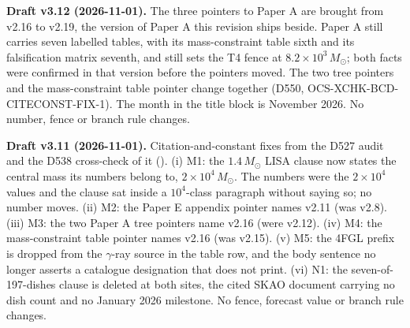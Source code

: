 \documentclass[11pt]{article}
\newcommand{\msun}{\ensuremath{M_\odot}}
\begin{document}
\textbf{Draft v3.12 (2026-11-01).} The three pointers to Paper A are brought from v2.16 to v2.19, the version of Paper A this revision ships beside. Paper A still carries seven labelled tables, with its mass-constraint table sixth and its falsification matrix seventh, and still sets the T4 fence at $8.2\times10^{3}\,\msun$; both facts were confirmed in that version before the pointers moved. The two tree pointers and the mass-constraint table pointer change together (D550, OCS-XCHK-BCD-CITECONST-FIX-1). The month in the title block is November 2026. No number, fence or branch rule changes.

\textbf{Draft v3.11 (2026-11-01).} Citation-and-constant fixes from the D527 audit and the D538 cross-check of it (). (i) M1: the $1.4\,\msun$ LISA clause now states the central mass its numbers belong to, $2\times10^{4}\,\msun$. The numbers were the $2\times10^{4}$ values and the clause sat inside a $10^{4}$-class paragraph without saying so; no number moves. (ii) M2: the Paper E appendix pointer names v2.11 (was v2.8). (iii) M3: the two Paper A tree pointers name v2.16 (were v2.12). (iv) M4: the mass-constraint table pointer names v2.16 (was v2.15). (v) M5: the 4FGL prefix is dropped from the $\gamma$-ray source in the table row, and the body sentence no longer asserts a catalogue designation that \citet{Dai2020} does not print. (vi) N1: the seven-of-197-dishes clause is deleted at both sites, the cited SKAO document carrying no dish count and no January 2026 milestone. No fence, forecast value or branch rule changes.
\end{document}
